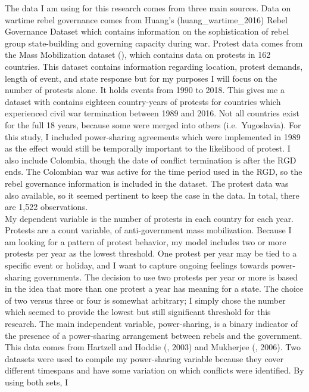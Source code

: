 \documentclass[11pt,]{article}
\begin{document}
The data I am using for this research comes from three main sources.
Data on wartime rebel governance comes from Huang's
(huang\_wartime\_2016) Rebel Governance Dataset which contains
information on the sophistication of rebel group state-building and
governing capacity during war. Protest data comes from the Mass
Mobilization dataset (\citet{clark_mass_2016}), which contains data on
protests in 162 countries. This dataset contains information regarding
location, protest demands, length of event, and state response but for
my purposes I will focus on the number of protests alone. It holds
events from 1990 to 2018. This gives me a dataset with contains eighteen
country-years of protests for countries which experienced civil war
termination between 1989 and 2016. Not all countries exist for the full
18 years, because some were merged into others (i.e.~Yugoslavia). For
this study, I included power-sharing agreements which were implemented
in 1989 as the effect would still be temporally important to the
likelihood of protest. I also include Colombia, though the date of
conflict termination is after the RGD ends. The Colombian war was active
for the time period used in the RGD, so the rebel governance information
is included in the dataset. The protest data was also available, so it
seemed pertinent to keep the case in the data. In total, there are 1,522
observations.\\
My dependent variable is the number of protests in each country for each
year. Protests are a count variable, of anti-government mass
mobilization. Because I am looking for a pattern of protest behavior, my
model includes two or more protests per year as the lowest threshold.
One protest per year may be tied to a specific event or holiday, and I
want to capture ongoing feelings towards power-sharing governments. The
decision to use two protests per year or more is based in the idea that
more than one protest a year has meaning for a state. The choice of two
versus three or four is somewhat arbitrary; I simply chose the number
which seemed to provide the lowest but still significant threshold for
this research. The main independent variable, power-sharing, is a binary
indicator of the presence of a power-sharing arrangement between rebels
and the government. This data comes from Hartzell and Hoddie
(\citet{hartzell_institutionalizing_2008}, 2003) and Mukherjee
(\citet{mukherjee_why_2006}, 2006). Two datasets were used to compile my
power-sharing variable because they cover different timespans and have
some variation on which conflicts were identified. By using both sets, I
\end{document}
